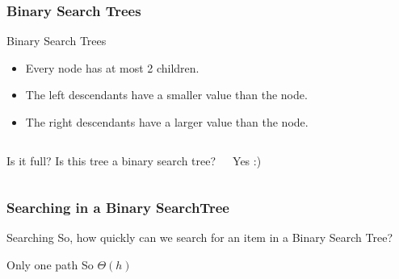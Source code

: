 \begin{frame}
	\frametitle{Binary Search Trees}
	
	\begin{block}{Binary \alert{Search} Trees}
		\begin{itemize}
			\item Every node has at most 2 children.
				\pause
			\item The left descendants have a smaller value than the node.
			\item The right descendants have a larger value than the node.
		\end{itemize}
	\end{block}	
	\pause
	\begin{columns}


		\begin{block}{Is it full?}
			Is this tree a binary search tree?
		\end{block}
		\pause
		\begin{block}{}
			Yes :)	
		\end{block}
	\end{columns}
\end{frame}

\begin{frame}
	\frametitle{Searching in a Binary SearchTree}
	
	\vspace{-20pt}
	\begin{overlayarea}{\textwidth}{\textheight}
		\begin{block}{Searching}
			So, how quickly can we search for an item in a Binary Search Tree?
			\only<1>{
			\begin{enumerate}[A.]
				\item $\Theta(\log h)$
				\item $\Theta(h)$
				\item $\Theta(\log n)$
				\item $\Theta(n)$
				\item $\Theta($\textit{I don't know man}$)$
			\end{enumerate}
		}
		\end{block}
		\pause
		
		\pause
	\vspace{-10pt}
		\begin{block}{Only one path}
			So $\Theta(h)$
		\end{block}
	\end{overlayarea}
\end{frame}

